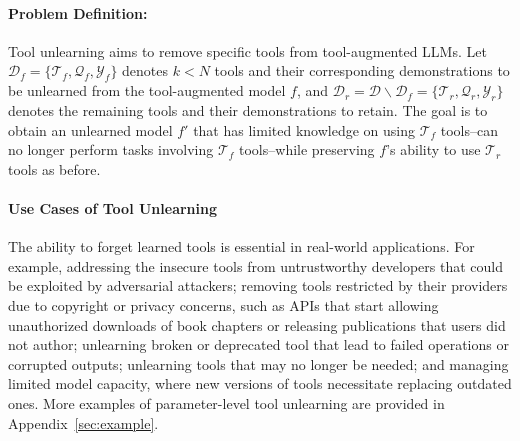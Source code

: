 \paragraph{Problem Definition:} Tool unlearning aims to remove specific tools from tool-augmented LLMs. Let $\mathcal{D}_f = \{ \mathcal{T}_f, \mathcal{Q}_f, \mathcal{Y}_f \}$ denotes $k < N$ tools and their corresponding demonstrations to be unlearned from the tool-augmented model $f$, and $\mathcal{D}_r = \mathcal{D} \backslash \mathcal{D}_f = \{ \mathcal{T}_r, \mathcal{Q}_r, \mathcal{Y}_r \}$ denotes the remaining tools and their demonstrations to retain. The goal is to obtain an unlearned model $f'$ that has limited knowledge on using $\mathcal{T}_f$ tools--can no longer perform tasks involving $\mathcal{T}_f$ tools--while preserving $f$'s ability to use $\mathcal{T}_r$ tools as before.

\paragraph{Use Cases of Tool Unlearning}\label{sec:app}
The ability to forget learned tools is essential in real-world applications. For example, 
addressing the insecure tools from untrustworthy developers that could be exploited by adversarial attackers;
%
removing tools restricted by their providers due to copyright or privacy concerns, such as APIs that start allowing unauthorized downloads of book chapters or releasing publications that users did not author; 
%
unlearning broken or deprecated tool that lead to failed operations or corrupted outputs;
%
unlearning tools that may no longer be needed; 
%
and managing limited model capacity, where new versions of tools necessitate replacing outdated ones. More examples of parameter-level tool unlearning are provided in Appendix~\ref{sec:example}.



    
